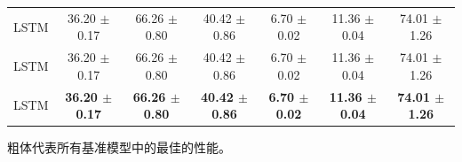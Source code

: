 \begin{table}
\begin{threeparttable}
\begin{tabular}{c|ccc|ccc}
			LSTM & 36.20 $\pm$0.17 & 66.26 $\pm$0.80 & 40.42 $\pm$0.86 & 6.70 $\pm$0.02 & 11.36 $\pm$0.04 & 74.01 $\pm$1.26  \\
			LSTM & 36.20 $\pm$0.17 & 66.26 $\pm$0.80 & 40.42 $\pm$0.86 & 6.70 $\pm$0.02 & 11.36 $\pm$0.04 & 74.01 $\pm$1.26  \\
			LSTM & \textbf{36.20 $\pm$0.17} & \textbf{66.26 $\pm$0.80} & \textbf{40.42 $\pm$0.86} & \textbf{6.70 $\pm$0.02} & \textbf{11.36 $\pm$0.04} & \textbf{74.01 $\pm$1.26}  \\
			\bottomrule
		\end{tabular}
		\begin{tablenotes}
			\footnotesize
			\item[*] 粗体代表所有基准模型中的最佳的性能。
		\end{tablenotes}
	\end{threeparttable}
	\label{tab:ch2_res3}
\end{table}


